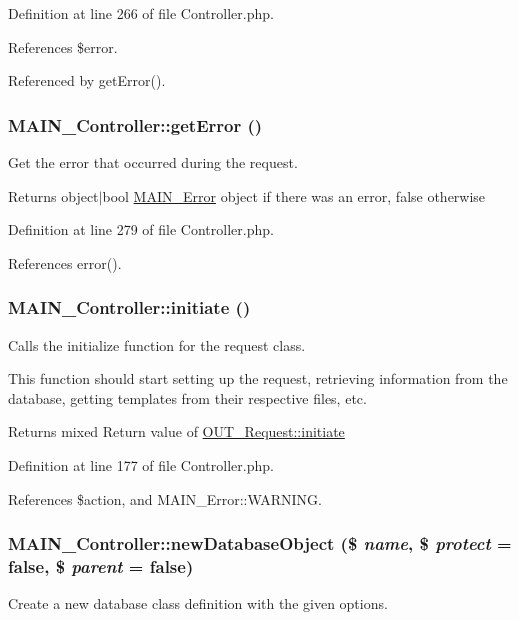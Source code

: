 Definition at line 266 of file Controller.php.

References \$error.

Referenced by getError().\hypertarget{classMAIN__Controller_a8d9ca0c2bdd69d2d18fa90de23acc2de}{
\subsubsection[{getError}]{\setlength{\rightskip}{0pt plus 5cm}MAIN\_\-Controller::getError ()}}
\label{d0/d6f/classMAIN__Controller_a8d9ca0c2bdd69d2d18fa90de23acc2de}
Get the error that occurred during the request.

\begin{DoxyReturn}{Returns}
object$|$bool \hyperlink{classMAIN__Error}{MAIN\_\-Error} object if there was an error, false otherwise 
\end{DoxyReturn}


Definition at line 279 of file Controller.php.

References error().\hypertarget{classMAIN__Controller_a63a01965c1673fbdbe5eb374ddf5c8d6}{
\subsubsection[{initiate}]{\setlength{\rightskip}{0pt plus 5cm}MAIN\_\-Controller::initiate ()}}
\label{d0/d6f/classMAIN__Controller_a63a01965c1673fbdbe5eb374ddf5c8d6}
Calls the initialize function for the request class.

This function should start setting up the request, retrieving information from the database, getting templates from their respective files, etc.

\begin{DoxyReturn}{Returns}
mixed Return value of \hyperlink{classOUT__Request_a825f77601714b2cb7510ab65d2d71483}{OUT\_\-Request::initiate} 
\end{DoxyReturn}


Definition at line 177 of file Controller.php.

References \$action, and MAIN\_\-Error::WARNING.\hypertarget{classMAIN__Controller_abdf41ec9c3425b16d70236e0fe497b9f}{
\subsubsection[{newDatabaseObject}]{\setlength{\rightskip}{0pt plus 5cm}MAIN\_\-Controller::newDatabaseObject (\$ {\em name}, \/  \$ {\em protect} = {\ttfamily false}, \/  \$ {\em parent} = {\ttfamily false})}}
\label{d0/d6f/classMAIN__Controller_abdf41ec9c3425b16d70236e0fe497b9f}
Create a new database class definition with the given options.


